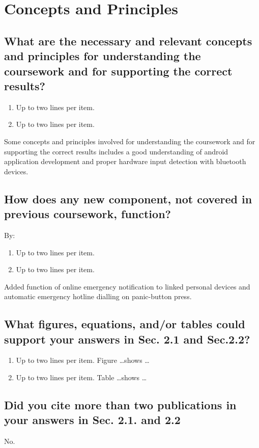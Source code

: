 \section{Concepts and Principles}
\label{sec:concps}

\subsection{What are the necessary and relevant concepts and principles for understanding the coursework and for supporting the correct results?}
\begin{enumerate}
	\item Up to two lines per item.
	\item Up to two lines per item.
\end{enumerate}
Some concepts and principles involved for understanding the coursework and for supporting the correct results includes a good understanding of android application development and proper hardware input detection with bluetooth devices.

\subsection{How does any new component, not covered in  previous coursework, function?}
By:
\begin{enumerate}
	\item Up to two lines per item.
	\item Up to two lines per item.
\end{enumerate}
Added function of online emergency notification to linked personal devices and automatic emergency hotline dialling on panic-button press.

\subsection{What figures, equations, and/or tables could support your answers in Sec. 2.1 and Sec.2.2?}
\begin{enumerate}
	\item Up to two lines per item. Figure \ldots shows \ldots
	\item Up to two lines per item. Table \ldots shows \ldots
\end{enumerate}

\subsection{Did you cite more than two publications in your answers in Sec. 2.1. and 2.2}
No.
	
